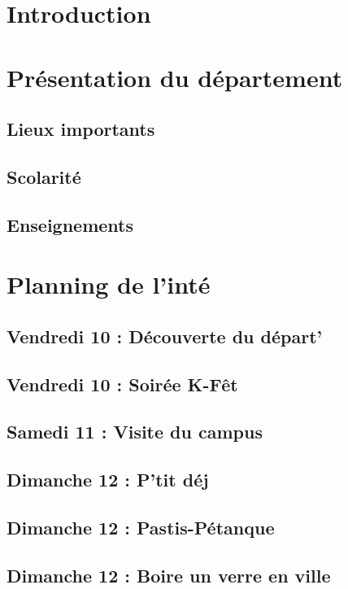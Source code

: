\newpage
\begin{multicols}{2}
\section{Introduction}
    
\section{Présentation du département}
    
    \subsection{Lieux importants}
    
    \subsection{Scolarité}
    
    \subsection{Enseignements}
    
\newpage
\section{Planning de l'inté}\label{rplanning}
    
    \subsection{Vendredi 10 : Découverte du départ'}
    
    \subsection{Vendredi 10 : Soirée K-Fêt}
    
    \subsection{Samedi 11 : Visite du campus}
    
    \subsection{Dimanche 12 : P'tit déj}
    
    \subsection{Dimanche 12 : Pastis-Pétanque}
    
    \subsection{Dimanche 12 : Boire un verre en ville}
    

\end{multicols}

